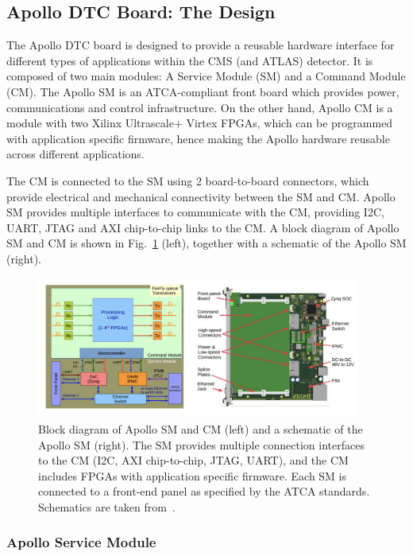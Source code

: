 \subsection{Apollo DTC Board: The Design}

The Apollo DTC board is designed to provide a reusable hardware interface for different types of applications within the
CMS (and ATLAS) detector. It is composed of two main modules: A Service Module (SM) and a Command Module (CM).
The Apollo SM is an ATCA-compliant front board which provides power, communications and control infrastructure.
On the other hand, Apollo CM is a module with two Xilinx Ultrascale+ Virtex FPGAs, which can be programmed with
application specific firmware, hence making the Apollo hardware reusable across different applications. 

The CM is connected to the SM using 2 board-to-board connectors, which provide electrical and mechanical 
connectivity between the SM and CM. Apollo SM provides multiple interfaces to communicate with the CM,
providing I2C, UART, JTAG and AXI chip-to-chip links to the CM.
A block diagram of Apollo SM and CM is shown in Fig.~\ref{fig:apollo_schematic} (left), together with
a schematic of the Apollo SM (right).

\begin{figure}[htbp]
    \centering
    \includegraphics[width=0.95\textwidth]{TrackerUpgrade/Apollo/apollo_schematic.png}
    \caption{Block diagram of Apollo SM and CM (left) and a schematic of the Apollo SM (right). The SM provides
    multiple connection interfaces to the CM (I2C, AXI chip-to-chip, JTAG, UART), and the CM includes FPGAs with
    application specific firmware. Each SM is connected to a front-end panel as specified by the ATCA standards. 
    Schematics are taken from~\cite{CMS:ApolloPaper}.}
    \label{fig:apollo_schematic}
\end{figure}

\subsubsection{Apollo Service Module}

